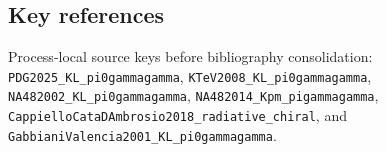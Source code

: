 \subsection*{Key references}
Process-local source keys before bibliography consolidation: \texttt{PDG2025\_KL\_pi0gammagamma}, \texttt{KTeV2008\_KL\_pi0gammagamma}, \texttt{NA482002\_KL\_pi0gammagamma}, \texttt{NA482014\_Kpm\_pigammagamma}, \texttt{CappielloCataDAmbrosio2018\_radiative\_chiral}, and \texttt{GabbianiValencia2001\_KL\_pi0gammagamma}.
